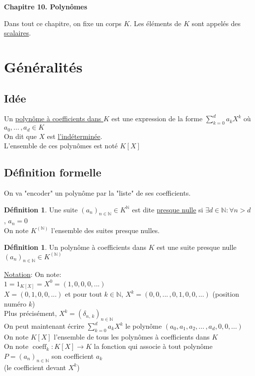 \documentclass[10pt,a4paper]{article}
\theoremstyle{definition}
\newtheorem{definition}[proposition]{Définition}
\DeclareMathOperator{\coeff}{coeff}
\begin{document}
\renewcommand{\labelitemi}{$*$}
\renewcommand{\labelenumi}{(\roman{enumi})}
\begin{center}
{\Large \textbf{Chapitre 10. Polynômes}}
\end{center}
Dans tout ce chapitre, on fixe un corps $K$. Les éléments de $K$ sont appelés des \uline{scalaires}.

\section{Généralités}
\subsection{Idée}
\noindent Un \uline{polynôme à coefficients dans $K$} est une expression de la forme $\sum\limits_{k = 0}^d a_k X^k$ où $a_0, ...\,, a_d \in K$ \\
On dit que $X$ est \uline{l'indéterminée}. \\
L'ensemble de ces polynômes est noté $K[X]$

\subsection{Définition formelle}
On va "encoder" un polynôme par la "liste" de ses coefficients.
\begin{definition}
Une suite $(a_n)_{n \in \mathbb{N}} \in K^\mathbb{N}$ est dite \uline{presque nulle} si $\exists d \in \mathbb{N}: \forall n > d$, $a_n = 0$ \\
On note $K^{(\mathbb{N})}$ l'ensemble des suites presque nulles.
\end{definition}
\begin{definition}
Un polynôme à coefficients dans $K$ est une suite presque nulle $(a_n)_{n \in \mathbb{N}} \in K^{(\mathbb{N})}$
\end{definition}
\noindent \uline{Notation}: On note: \\
$1 = 1_{K[X]} = X^0 = (1, 0, 0, 0, ...)$ \\
$X = (0, 1, 0, 0, ...)$ et pour tout $k \in \mathbb{N}$, $X^k = (0, 0, ...\,, 0, 1, 0, 0, ...)$ (position numéro $k$) \\
Plus précisément, $X^k = (\delta_{n,\,k})_{n \in \mathbb{N}}$ \\
On peut maintenant écrire $\sum\limits_{k = 0}^d a_k X^k$ le polynôme $(a_0, a_1, a_2, ...\,, a_d, 0, 0, ...)$ \\
On note $K[X]$ l'ensemble de tous les polynômes à coefficients dans $K$ \\
On note $\coeff_k: K[X] \to K$ la fonction qui associe à tout polynôme $P = (a_n)_{n \in \mathbb{N}}$ son coefficient $a_k$ \\
(le coefficient devant $X^k$)
\end{document}
